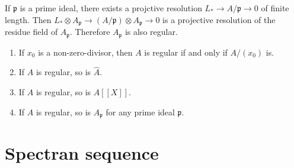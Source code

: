 \documentclass[leqno]{amsart}
\newcommand{\1}{\mathbf{1}}
\newcommand{\fp}{\mathfrak p}
\theoremstyle{definition}
\theoremstyle{remark}
\begin{document}
If $\fp$ is a prime ideal,
there exists a projctive resolution
$L_*\to A/\fp\to 0$ of finite length.
Then $L_*\otimes A_\fp\to (A/\fp)\otimes A_\fp\to 0$
is a projective resolution of the residue field of $A_\fp$.
Therefore  $A_\fp$ is also regular.

\begin{enumerate}
	\item If $x_0$ is a non-zero-divisor, then
		 $A$ is regular if and only if 
		 $A/(x_0)$ is.
	 \item If $A$ is regular, so is $\hat{A}$.
	 \item If $A$ is regular, so is $A[[X]]$.
	 \item If $A$ is regular, so is $A_\fp$
		 for any prime ideal $\fp$.
\end{enumerate}


\section{Spectran sequence}
\end{document}
